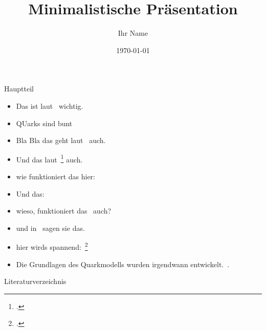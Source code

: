 \documentclass[aspectratio=169]{beamer} %
\title{Minimalistische Präsentation}
\author{Ihr Name}\date{\today}
\begin{document}
    \begin{frame}{Hauptteil}
        \begin{itemize}
            \item Das ist laut~\parencite{Zweig.1964b} wichtig.
            \item QUarks sind bunt~
            \item Bla Bla das geht laut~ auch.
            \item Und das laut~\footcite{Zweig.1964} auch.
            \item wie funktioniert das hier:~\textcite{Wikipedia.Standardmodell}
            \item Und das:~
            \item wieso, funktioniert das~\autocite{GellMann.1964} auch?
            \item und in~\cite{Aaij.2015} sagen sie das.
            \item hier wirds spannend:~\footcitetext{Aaij.2015}
            \item Die Grundlagen des Quarkmodells wurden irgendwann entwickelt.~\parencite{Aaij.2019}.
        \end{itemize}
    \end{frame}

    \begin{frame}[allowframebreaks]{Literaturverzeichnis}
        \printbibliography\end{frame}
\end{document}
